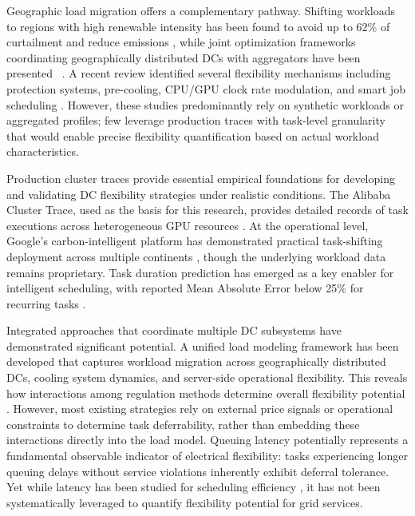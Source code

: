 \documentclass[preprint,12pt]{elsarticle}
\begin{document}
Geographic load migration offers a complementary pathway. Shifting workloads to regions with high renewable intensity has been found to avoid up to 62\% of curtailment and reduce emissions \cite{Zheng2020}, while joint optimization frameworks coordinating geographically distributed DCs with aggregators have been presented ~\cite{ZHANG2024DR}. A recent review identified several flexibility mechanisms including protection systems, pre-cooling, CPU/GPU clock rate modulation, and smart job scheduling \cite{Crozier2025}. However, these studies predominantly rely on synthetic workloads or aggregated profiles; few leverage production traces with task-level granularity that would enable precise flexibility quantification based on actual workload characteristics.

Production cluster traces provide essential empirical foundations for developing and validating DC flexibility strategies under realistic conditions. The Alibaba Cluster Trace, used as the basis for this research, provides detailed records of task executions across heterogeneous GPU resources \cite{AlibabaTrace2021, Weng2022}. At the operational level, Google's carbon-intelligent platform has demonstrated practical task-shifting deployment across multiple continents \cite{Radovanovic2023}, though the underlying workload data remains proprietary. Task duration prediction has emerged as a key enabler for intelligent scheduling, with reported Mean Absolute Error below 25\% for recurring tasks \cite{Weng2022, Hu2021, Yeung2022, Kawaguchi2024}.

Integrated approaches that coordinate multiple DC subsystems have demonstrated significant potential. A unified load modeling framework has been developed that captures workload migration across geographically distributed DCs, cooling system dynamics, and server-side operational flexibility. This reveals how interactions among regulation methods determine overall flexibility potential \cite{Chen2021_TSG}. However, most existing strategies rely on external price signals or operational constraints to determine task deferrability, rather than embedding these interactions directly into the load model. Queuing latency potentially represents a fundamental observable indicator of electrical flexibility: tasks experiencing longer queuing delays without service violations inherently exhibit deferral tolerance. Yet while latency has been studied for scheduling efficiency \cite{Weng2022, Xiao2020}, it has not been systematically leveraged to quantify flexibility potential for grid services.
\end{document}
